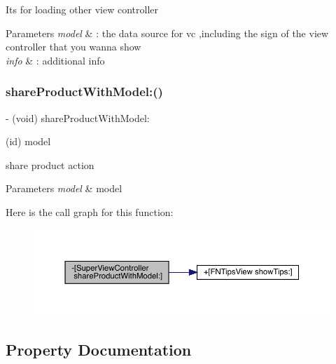 It\textquotesingle{}s for loading other view controller


\begin{DoxyParams}{Parameters}
{\em model} & \+: the data source for vc ,including the sign of the view controller that you wanna show \\
\hline
{\em info} & \+: additional info \\
\hline
\end{DoxyParams}
\mbox{\label{interface_super_view_controller_a7f39ea3d8c7b831c07aa963d9c0a95b2}} 
\subsubsection{\texorpdfstring{share\+Product\+With\+Model\+:()}{shareProductWithModel:()}}
{\footnotesize\ttfamily -\/ (void) share\+Product\+With\+Model\+: \begin{DoxyParamCaption}\item[{(id)}]{model }\end{DoxyParamCaption}}

share product action


\begin{DoxyParams}{Parameters}
{\em model} & model \\
\hline
\end{DoxyParams}
Here is the call graph for this function\+:\nopagebreak
\begin{figure}[H]
\begin{center}
\leavevmode
\includegraphics[width=350pt]{interface_super_view_controller_a7f39ea3d8c7b831c07aa963d9c0a95b2_cgraph}
\end{center}
\end{figure}


\subsection{Property Documentation}
\mbox{\label{interface_super_view_controller_a1afb83eb32eb7a23916d36fa2d0f18f2}} 
